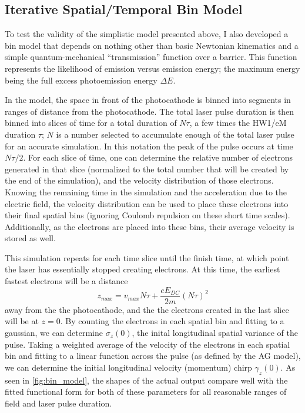 \subsection{Iterative Spatial/Temporal Bin Model} \label{sec:bin_model}

To test the validity of the simplistic model presented above, I also developed a bin model that depends on nothing other than basic Newtonian kinematics and a simple quantum-mechanical ``transmission'' function over a barrier.
This function represents the likelihood of emission versus emission energy; the maximum energy being the full excess photoemission energy $\Delta E$.

In the model, the space in front of the photocathode is binned into segments in ranges of distance from the photocathode.
The total laser pulse duration is then binned into slices of time for a total duration of $N \tau$, a few times the HW1/eM duration $\tau$; $N$ is a number selected to accumulate enough of the total laser pulse for an accurate simulation.
In this notation the peak of the pulse occurs at time $N \tau / 2$.
For each slice of time, one can determine the relative number of electrons generated in that slice (normalized to the total number that will be created by the end of the simulation), and the velocity distribution of those electrons.
Knowing the remaining time in the simulation and the acceleration due to the electric field, the velocity distribution can be used to place these electrons into their final spatial bins (ignoring Coulomb repulsion on these short time scales).
Additionally, as the electrons are placed into these bins, their average velocity is stored as well.

This simulation repeats for each time slice until the finish time, at which point the laser has essentially stopped creating electrons.
At this time, the earliest fastest electrons will be a distance 
\begin{equation}
  z_{max} = v_{max}N \tau + \frac{e E_{ DC }}{2 m} (N \tau)^2 
\end{equation}
away from the the photocathode, and the the electrons created in the last slice will be at $z=0$.
By counting the electrons in each spatial bin and fitting to a gaussian, we can determine $\sigma_z(0)$, the inital longitudinal spatial variance of the pulse.
Taking a weighted average of the velocity of the electrons in each spatial bin and fitting to a linear function across the pulse (as defined by the AG model), we can determine the initial longitudinal velocity (momentum) chirp $\gamma_z(0)$.
As seen in \ref{fig:bin_model}, the shapes of the actual output compare well with the fitted functional form for both of these parameters for all reasonable ranges of field and laser pulse duration.


